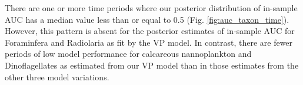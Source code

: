 \documentclass[12pt,letterpaper]{article}
\begin{document}
\begin{refsection}


There are one or more time periods where our posterior distribution of in-sample AUC has a median value less than or equal to 0.5 (Fig. \ref{fig:auc_taxon_time}). However, this pattern is absent for the posterior estimates of in-sample AUC for Foraminfera and Radiolaria as fit by the VP model. In contrast, there are fewer periods of low model performance for calcareous nannoplankton and Dinoflagellates as estimated from our VP model than in those estimates from the other three model variations.


\end{refsection}
\end{document}
